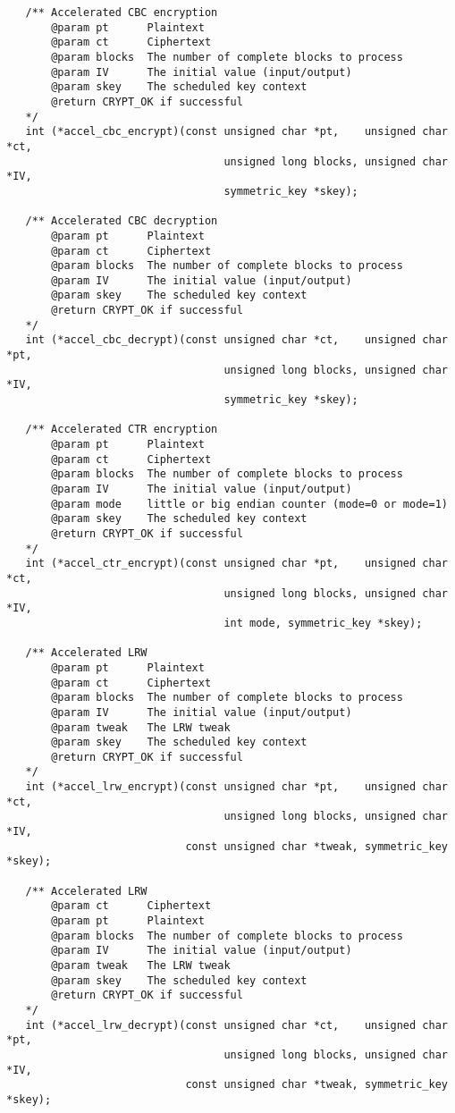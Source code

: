\documentclass[a4paper]{book}
\begin{document}
\begin{small}
\begin{verbatim}
   /** Accelerated CBC encryption 
       @param pt      Plaintext
       @param ct      Ciphertext
       @param blocks  The number of complete blocks to process
       @param IV      The initial value (input/output)
       @param skey    The scheduled key context
       @return CRYPT_OK if successful
   */
   int (*accel_cbc_encrypt)(const unsigned char *pt,    unsigned char *ct, 
                                  unsigned long blocks, unsigned char *IV, 
                                  symmetric_key *skey);

   /** Accelerated CBC decryption 
       @param pt      Plaintext
       @param ct      Ciphertext
       @param blocks  The number of complete blocks to process
       @param IV      The initial value (input/output)
       @param skey    The scheduled key context
       @return CRYPT_OK if successful
   */
   int (*accel_cbc_decrypt)(const unsigned char *ct,    unsigned char *pt, 
                                  unsigned long blocks, unsigned char *IV, 
                                  symmetric_key *skey);

   /** Accelerated CTR encryption 
       @param pt      Plaintext
       @param ct      Ciphertext
       @param blocks  The number of complete blocks to process
       @param IV      The initial value (input/output)
       @param mode    little or big endian counter (mode=0 or mode=1)
       @param skey    The scheduled key context
       @return CRYPT_OK if successful
   */
   int (*accel_ctr_encrypt)(const unsigned char *pt,    unsigned char *ct,
                                  unsigned long blocks, unsigned char *IV, 
                                  int mode, symmetric_key *skey);

   /** Accelerated LRW 
       @param pt      Plaintext
       @param ct      Ciphertext
       @param blocks  The number of complete blocks to process
       @param IV      The initial value (input/output)
       @param tweak   The LRW tweak
       @param skey    The scheduled key context
       @return CRYPT_OK if successful
   */
   int (*accel_lrw_encrypt)(const unsigned char *pt,    unsigned char *ct, 
                                  unsigned long blocks, unsigned char *IV, 
                            const unsigned char *tweak, symmetric_key *skey);

   /** Accelerated LRW 
       @param ct      Ciphertext
       @param pt      Plaintext
       @param blocks  The number of complete blocks to process
       @param IV      The initial value (input/output)
       @param tweak   The LRW tweak
       @param skey    The scheduled key context
       @return CRYPT_OK if successful
   */
   int (*accel_lrw_decrypt)(const unsigned char *ct,    unsigned char *pt, 
                                  unsigned long blocks, unsigned char *IV, 
                            const unsigned char *tweak, symmetric_key *skey);


\end{verbatim}
\end{small}
\end{document}
